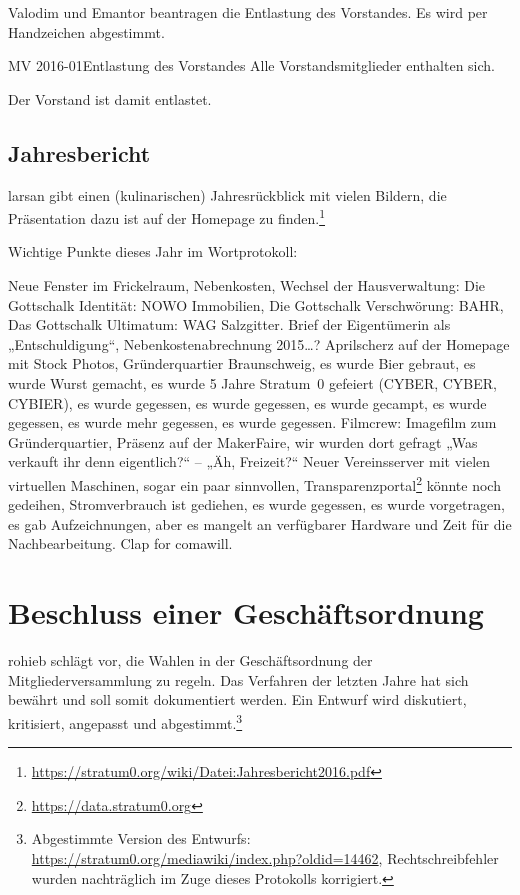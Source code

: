 \documentclass{s0minutes}
\begin{document}
Valodim und Emantor beantragen die Entlastung des Vorstandes. Es wird per
Handzeichen abgestimmt. 

\begin{resolution}{MV 2016-01}{}{Entlastung des
  Vorstandes}{}
  Alle Vorstandsmitglieder enthalten sich.
\end{resolution}

Der Vorstand ist damit entlastet.

\subsection{Jahresbericht}
larsan gibt einen (kulinarischen) Jahresrückblick mit vielen Bildern, die
Präsentation dazu ist auf der Homepage zu
finden.\footnote{\url{https://stratum0.org/wiki/Datei:Jahresbericht2016.pdf}}

Wichtige Punkte dieses Jahr im Wortprotokoll:

Neue Fenster im Frickelraum, Nebenkosten, Wechsel der Hausverwaltung: Die
Gottschalk Identität: NOWO Immobilien, Die Gottschalk Verschwörung: BAHR, Das
Gottschalk Ultimatum: WAG Salzgitter. Brief der Eigentümerin als
„Entschuldigung“, Nebenkostenabrechnung 2015…? Aprilscherz auf der Homepage mit
Stock Photos, Gründerquartier Braunschweig, es wurde Bier gebraut, es wurde
Wurst gemacht, es wurde 5 Jahre Stratum~0 gefeiert (CYBER, CYBER, CYBIER), es
wurde gegessen, es wurde gegessen, es wurde gecampt, es wurde gegessen, es wurde
mehr gegessen, es wurde gegessen. Filmcrew: Imagefilm zum Gründerquartier,
Präsenz auf der MakerFaire, wir wurden dort gefragt „Was verkauft ihr denn
eigentlich?“ – „Äh, Freizeit?“ Neuer Vereinsserver mit vielen virtuellen
Maschinen, sogar ein paar sinnvollen,
Transparenzportal\footnote{\url{https://data.stratum0.org}} könnte noch
gedeihen, Stromverbrauch ist gediehen, es wurde gegessen, es wurde vorgetragen,
es gab Aufzeichnungen, aber es mangelt an verfügbarer Hardware und Zeit für die
Nachbearbeitung. Clap for comawill.


\section{Beschluss einer Geschäftsordnung}

rohieb schlägt vor, die Wahlen in der Geschäftsordnung der Mitgliederversammlung
zu regeln. Das Verfahren der letzten Jahre hat sich bewährt und soll somit
dokumentiert werden. Ein Entwurf wird diskutiert, kritisiert, angepasst und
abgestimmt.\footnote{Abgestimmte Version des Entwurfs:
\url{https://stratum0.org/mediawiki/index.php?oldid=14462}, Rechtschreibfehler
wurden nachträglich im Zuge dieses Protokolls korrigiert.}
\end{document}
